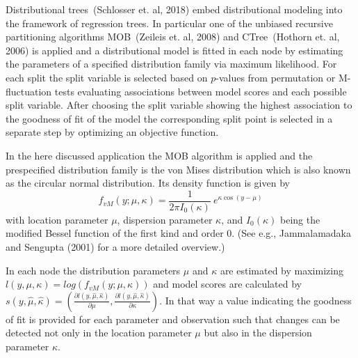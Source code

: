 \documentclass[twoside]{report}
\begin{document}
Distributional trees~(Schlosser et. al, 2018) embed distributional modeling into the framework 
of regression trees.
In particular one of the unbiased recursive partitioning algorithms MOB~(Zeileis et. al, 2008) 
and CTree~(Hothorn et. al, 2006) is applied and a distributional model is fitted in each node 
by estimating the parameters of a specified distribution family via maximum likelihood.
For each split the split variable is selected based on $p$-values from permutation or M-fluctuation 
tests evaluating associations between model scores and each possible split variable. After choosing 
the split variable showing the highest association to the goodness of fit of the model the corresponding split point is selected in a separate step by optimizing an objective function.

In the here discussed application the MOB algorithm is applied and the prespecified 
distribution family is the von Mises distribution which is also known as the circular 
normal distribution. Its density function is given by
\begin{equation}
  f_{vM}(y; \mu, \kappa) = \frac{1}{2 \pi I_0(\kappa)}~e^{ \kappa \cos(y - \mu)}\label{equ:vm}
\end{equation}
with location parameter $\mu$, dispersion parameter $\kappa$, and $I_0(\kappa)$ being the 
modified Bessel function of the first kind and order $0$.
(See e.g., Jammalamadaka and Sengupta (2001) for a more detailed overview.)

In each node the distribution parameters $\mu$ and $\kappa$ are 
estimated by maximizing $l(y, \mu, \kappa) = log(f_{vM}(y;\mu, \kappa))$ and model scores are calculated by 
$s(y,\hat{\mu}, \hat{\kappa}) = \left(\frac{\partial l(y, \hat{\mu}, \hat{\kappa})}{\partial \mu},
\frac{\partial l(y, \hat{\mu}, \hat{\kappa})}{\partial \kappa}\right)$. 
In that way a value indicating the goodness of fit is provided for each parameter and observation
such that changes can be detected not only in the location parameter $\mu$ but also in the 
dispersion parameter $\kappa$.
\end{document}
